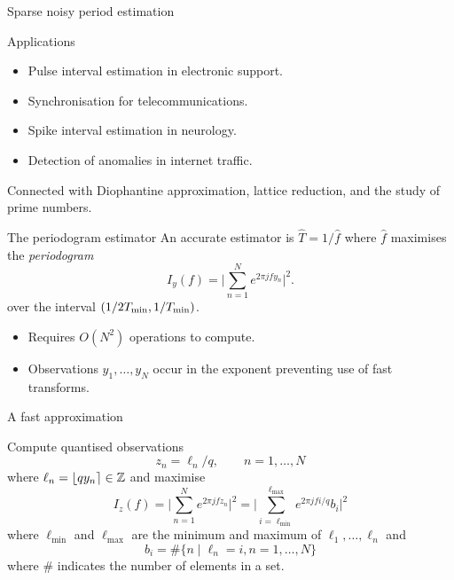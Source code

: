 \documentclass[final,hyperref={pdfpagelabels=false}]{beamer}
\begin{document}
\begin{columns}[t]
\begin{column}{.49\textwidth}
\begin{block}{Sparse noisy period estimation}
\end{block}  

\begin{block}{Applications}
\begin{itemize}
\item Pulse interval estimation in electronic support.%
\item Synchronisation for telecommunications.%
\item Spike interval estimation in neurology.%
\item Detection of anomalies in internet traffic.%
\end{itemize}
Connected with Diophantine approximation, lattice reduction, and the study of prime numbers.%
\end{block}

\newcommand{\abs}[1]{\left\vert #1 \right\vert}
\newcommand{\sabs}[1]{\vert #1 \vert}
\newcommand{\babs}[1]{\big\vert #1 \big\vert}


\begin{block}{The periodogram estimator}
An accurate estimator is $\widehat{T} = 1/\widehat{f}$ where $\widehat{f}$ maximises the \emph{periodogram}
\[
I_y(f) = \babs{ \sum_{n=1}^N e^{ 2\pi j f y_n} }^2.
\]
over the interval $(1/2T_{\text{min}}, 1/T_{\text{min}})$.  
\begin{itemize}
\item Requires $O(N^2)$ operations to compute. 
\item Observations $y_1,\dots,y_N$ occur in the exponent preventing use of fast transforms.
\end{itemize}
\end{block}

\newcommand{\ellmin}{\ell_{\text{min}}}
\newcommand{\ellmax}{\ell_{\text{max}}}

\begin{block}{A fast approximation}

Compute quantised observations
\[
z_n =  \ell_n/q, \qquad n = 1,\dots,N
\] 
where $\ell_n = \left\lfloor qy_n \right\rceil \in {\mathbb Z}$ and maximise
\[
I_z(f) = \babs{ \sum_{n=1}^N e^{ 2\pi j f z_n} }^2 = \babs{ \sum_{i = \ellmin}^{\ellmax} e^{2\pi j f i/q} b_i }^2
\]
where $\ellmin$ and $\ellmax$ are the minimum and maximum of $\ell_1,\dots,\ell_n$ and
\[
b_i= \#\{ n \mid \ell_n = i, n = 1,\dots, N\}
\]
where $\#$ indicates the number of elements in a set.


\end{block}
\end{column}
\end{columns}
\end{document}
